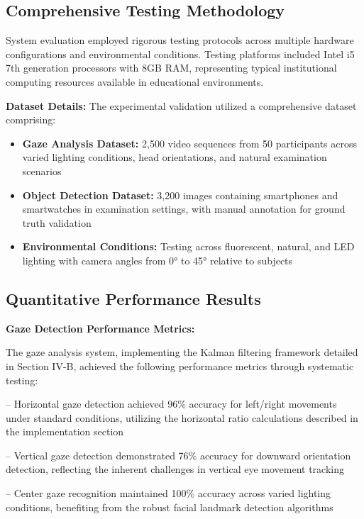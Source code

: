 \documentclass[conference]{IEEEtran}
\begin{document}
\subsection{Comprehensive Testing Methodology}

System evaluation employed rigorous testing protocols across multiple hardware configurations 
and environmental conditions. Testing platforms included Intel i5 7th generation processors 
with 8GB RAM, representing typical institutional computing resources available in educational 
environments.

\textbf{Dataset Details:} The experimental validation utilized a comprehensive dataset comprising:
\begin{itemize}
    \item \textbf{Gaze Analysis Dataset:} 2,500 video sequences from 50 participants across varied lighting conditions, head orientations, and natural examination scenarios
    \item \textbf{Object Detection Dataset:} 3,200 images containing smartphones and smartwatches in examination settings, with manual annotation for ground truth validation
    \item \textbf{Environmental Conditions:} Testing across fluorescent, natural, and LED lighting with camera angles from 0° to 45° relative to subjects
\end{itemize}

\subsection{Quantitative Performance Results}

\textbf{Gaze Detection Performance Metrics:}

The gaze analysis system, implementing the Kalman filtering framework detailed in Section IV-B, 
achieved the following performance metrics through systematic testing:

-- Horizontal gaze detection achieved 96\% accuracy for left/right movements under 
standard conditions, utilizing the horizontal ratio calculations described in the 
implementation section

-- Vertical gaze detection demonstrated 76\% accuracy for downward orientation 
detection, reflecting the inherent challenges in vertical eye movement tracking

-- Center gaze recognition maintained 100\% accuracy across varied lighting 
conditions, benefiting from the robust facial landmark detection algorithms
\end{document}
